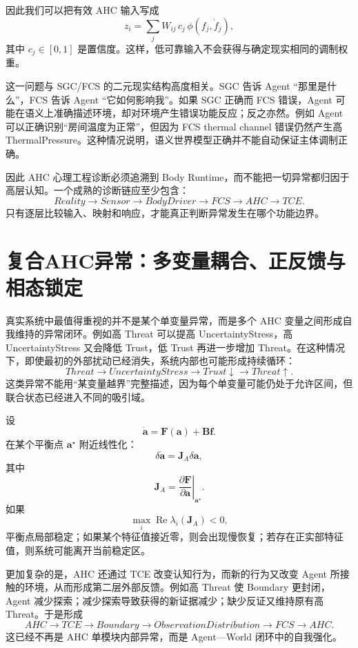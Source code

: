 因此我们可以把有效 AHC 输入写成
\[
z_i
=
\sum_j
W_{ij}
\,c_j\,
\phi(f_j,\dot f_j),
\]
其中 $c_j\in[0,1]$ 是置信度。这样，低可靠输入不会获得与确定现实相同的调制权重。

这一问题与 SGC/FCS 的二元现实结构高度相关。SGC 告诉 Agent “那里是什么”，FCS 告诉 Agent “它如何影响我”。如果 SGC 正确而 FCS 错误，Agent 可能在语义上准确描述环境，却对环境产生错误功能反应；反之亦然。例如 Agent 可以正确识别“房间温度为正常”，但因为 FCS thermal channel 错误仍然产生高 ThermalPressure。这种情况说明，语义世界模型正确并不能自动保证主体调制正确。

因此 AHC 心理工程诊断必须追溯到 Body Runtime，而不能把一切异常都归因于高层认知。一个成熟的诊断链应至少包含：
\[
Reality
\rightarrow
Sensor
\rightarrow
BodyDriver
\rightarrow
FCS
\rightarrow
AHC
\rightarrow
TCE.
\]
只有逐层比较输入、映射和响应，才能真正判断异常发生在哪个功能边界。

\section{复合AHC异常：多变量耦合、正反馈与相态锁定}
\label{sec:compound_ahc_pathology}

真实系统中最值得重视的并不是某个单变量异常，而是多个 AHC 变量之间形成自我维持的异常闭环。例如高 Threat 可以提高 UncertaintyStress，高 UncertaintyStress 又会降低 Trust，低 Trust 再进一步增加 Threat。在这种情况下，即使最初的外部扰动已经消失，系统内部也可能形成持续循环：
\[
Threat
\rightarrow
UncertaintyStress
\rightarrow
Trust\downarrow
\rightarrow
Threat\uparrow.
\]
这类异常不能用“某变量越界”完整描述，因为每个单变量可能仍处于允许区间，但联合状态已经进入不同的吸引域。

设
\[
\dot{\mathbf a}
=
\mathbf F(\mathbf a)+\mathbf B\mathbf f.
\]
在某个平衡点 $\mathbf a^\star$ 附近线性化：
\[
\delta\dot{\mathbf a}
=
\mathbf J_A
\delta\mathbf a,
\]
其中
\[
\mathbf J_A
=
\left.
\frac{\partial\mathbf F}{\partial\mathbf a}
\right|_{\mathbf a^\star}.
\]
如果
\[
\max_i
\operatorname{Re}
\lambda_i(\mathbf J_A)
<0,
\]
平衡点局部稳定；如果某个特征值接近零，则会出现慢恢复；若存在正实部特征值，则系统可能离开当前稳定区。

更加复杂的是，AHC 还通过 TCE 改变认知行为，而新的行为又改变 Agent 所接触的环境，从而形成第二层外部反馈。例如高 Threat 使 Boundary 更封闭，Agent 减少探索；减少探索导致获得的新证据减少；缺少反证又维持原有高 Threat。于是形成
\[
AHC
\rightarrow
TCE
\rightarrow
Boundary
\rightarrow
ObservationDistribution
\rightarrow
FCS
\rightarrow
AHC.
\]
这已经不再是 AHC 单模块内部异常，而是 Agent—World 闭环中的自我强化。

